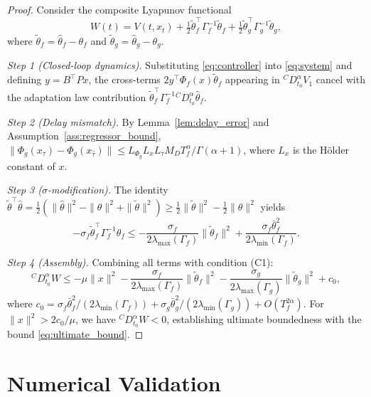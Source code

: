 \documentclass[12pt,a4paper]{article}
\begin{document}
\begin{proof}
Consider the composite Lyapunov functional
\begin{equation}
W(t) = V(t, x_t) + \tfrac{1}{2} \tilde{\theta}_f^{\!\top} \Gamma_f^{-1} \tilde{\theta}_f + \tfrac{1}{2} \tilde{\theta}_g^{\!\top} \Gamma_g^{-1} \tilde{\theta}_g,
\end{equation}
where $\tilde{\theta}_f = \hat{\theta}_f - \theta_f$ and $\tilde{\theta}_g = \hat{\theta}_g - \theta_g$.

\textit{Step 1 (Closed-loop dynamics).} Substituting \eqref{eq:controller} into \eqref{eq:system} and defining $y = B^{\!\top}\!Px$, the cross-terms $2y^{\!\top}\Phi_f(x)\tilde{\theta}_f$ appearing in ${}^{C}\!D^{\alpha}_{t_0}V_1$ cancel with the adaptation law contribution $\tilde{\theta}_f^{\!\top}\Gamma_f^{-1}{}^{C}\!D^{\alpha}_{t_0}\hat{\theta}_f$.

\textit{Step 2 (Delay mismatch).} By Lemma~\ref{lem:delay_error} and Assumption~\ref{ass:regressor_bound}, $\|\Phi_g(x_{\tau}) - \Phi_g(x_{\hat{\tau}})\| \leq L_{\Phi_g} L_x L_{\tau} M_D T_f^{\alpha}/\Gamma(\alpha+1)$, where $L_x$ is the H\"{o}lder constant of $x$.

\textit{Step 3 ($\sigma$-modification).} The identity $\tilde{\theta}^{\!\top}\hat{\theta} = \tfrac{1}{2}(\|\hat{\theta}\|^2 - \|\theta\|^2 + \|\tilde{\theta}\|^2) \geq \tfrac{1}{2}\|\tilde{\theta}\|^2 - \tfrac{1}{2}\|\theta\|^2$ yields
\begin{equation}
-\sigma_f \tilde{\theta}_f^{\!\top}\Gamma_f^{-1}\hat{\theta}_f \leq -\frac{\sigma_f}{2\lambda_{\max}(\Gamma_f)}\|\tilde{\theta}_f\|^2 + \frac{\sigma_f \bar{\theta}_f^2}{2\lambda_{\min}(\Gamma_f)}.
\end{equation}

\textit{Step 4 (Assembly).} Combining all terms with condition (C1):
\begin{equation}
{}^{C}\!D^{\alpha}_{t_0} W \leq -\mu\|x\|^2 - \frac{\sigma_f}{2\lambda_{\max}(\Gamma_f)}\|\tilde{\theta}_f\|^2 - \frac{\sigma_g}{2\lambda_{\max}(\Gamma_g)}\|\tilde{\theta}_g\|^2 + c_0,
\end{equation}
where $c_0 = \sigma_f\bar{\theta}_f^2/(2\lambda_{\min}(\Gamma_f)) + \sigma_g\bar{\theta}_g^2/(2\lambda_{\min}(\Gamma_g)) + O(T_f^{2\alpha})$. For $\|x\|^2 > 2c_0/\mu$, we have ${}^{C}\!D^{\alpha}_{t_0}W < 0$, establishing ultimate boundedness with the bound \eqref{eq:ultimate_bound}.
\end{proof}


\section{Numerical Validation}
\label{sec:numerics}
\end{document}
